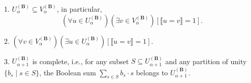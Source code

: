 1. $U_{\alpha}^{(\mathbf{B})} \subseteq V_{\alpha}^{(\mathbf{B})}$, in particular,
$$(\forall u \in U_{\alpha}^{(\mathbf{B})}) (\exists v \in V_{\alpha}^{(\mathbf{B})}) [\llbracket u = v \rrbracket = 1].$$

2. $(\forall v \in V_{\alpha}^{(\mathbf{B})}) (\exists u \in U_{\alpha}^{(\mathbf{B})}) [\llbracket u = v \rrbracket = 1].$

3. $U_{\alpha+1}^{(\mathbf{B})}$ is complete, i.e., for any subset $S \subseteq U_{\alpha+1}^{(\mathbf{B})}$ and any partition of unity $\{b_s \mid s \in S\}$, the Boolean sum $\sum_{s \in S} b_s \cdot s$ belongs to $U_{\alpha+1}^{(\mathbf{B})}$.
